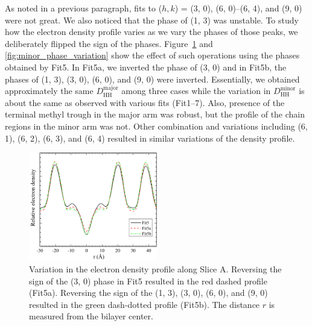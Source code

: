 As noted in a previous paragraph, fits to ($h, k$) = (3, 0), (6, 0)--(6, 4),
and (9, 0) were not great. We also noticed that the phase of (1, 3) was unstable. To study
how the electron density profile varies as we vary the phases of those peaks,
we deliberately flipped the sign of the phases. Figure~\ref{fig:major_phase_variation}
and \ref{fig:minor_phase_variation} show the effect of such operations
using the phases obtained by Fit5. 
In Fit5a, we inverted the phase of (3, 0) and in Fit5b, the phases of 
(1, 3), (3, 0), (6, 0), and (9, 0) were inverted.
Essentially, we obtained approximately the same $D_\text{HH}^\text{major}$
among three cases while the variation in $D_\text{HH}^\text{minor}$ is
about the same as observed with various fits (Fit1--7).
Also, presence of the terminal methyl trough in the major arm was robust, but
the profile of the chain regions in the minor arm was not.
Other combination and variations including (6, 1), (6, 2), (6, 3), and (6, 4)
resulted in similar variations of the density profile.

\begin{figure}[htbp]
  \centering
  \includegraphics[width=0.5\textwidth]{figures/ripple/LAXS/major_phase_variation}
  \caption{Variation in the electron density profile along Slice A. 
  Reversing the sign of the (3, 0) phase in Fit5 
  resulted in the red dashed profile (Fit5a). Reversing the sign of the 
  (1, 3), (3, 0), (6, 0), and (9, 0) resulted in the green dash-dotted profile
  (Fit5b). The distance $r$ is measured from the bilayer center.}
  \label{fig:major_phase_variation}
\end{figure}

